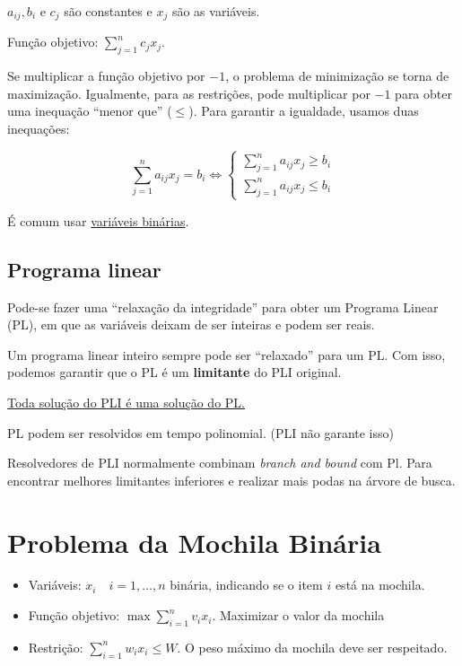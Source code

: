 $a_{ij}, b_i$ e $c_j$ são constantes e $x_j$ são as variáveis.

Função objetivo: $\sum_{j=1}^n c_jx_j$.

Se multiplicar a função objetivo por $-1$, o problema de minimização se torna de maximização. Igualmente, para as restrições, pode multiplicar por $-1$ para obter uma inequação ``menor que'' ($\leq$). Para garantir a igualdade, usamos duas inequações:

\[
    \sum_{j=1}^n a_{ij}x_j = b_i \iff
    \begin{cases}
        \sum_{j=1}^n a_{ij}x_j \geq b_i \\
        \sum_{j=1}^n a_{ij}x_j \leq b_i
    \end{cases}
\]

É comum usar \underline{variáveis binárias}.

\subsection{Programa linear}

Pode-se fazer uma ``relaxação da integridade'' para obter um Programa Linear (PL), em que as variáveis deixam de ser inteiras e podem ser reais.

Um programa linear inteiro sempre pode ser ``relaxado'' para um PL. Com isso, podemos garantir que o PL é um \textbf{limitante} do PLI original.

\underline{Toda solução do PLI é uma solução do PL.}

PL podem ser resolvidos em tempo polinomial. (PLI não garante isso)

Resolvedores de PLI normalmente combinam \textit{branch and bound} com Pl. Para encontrar melhores limitantes inferiores e realizar mais podas na árvore de busca.

\section{Problema da Mochila Binária}

\begin{itemize}
    \item Variáveis: $x_i \quad i = 1,\dots ,n$ binária, indicando se o item $i$ está na mochila.
    \item Função objetivo: $\max\sum_{i=1}^n v_ix_i$. Maximizar o valor da mochila
    \item Restrição: $\sum_{i=1}^n w_ix_i \leq W$. O peso máximo da mochila deve ser respeitado.
\end{itemize}


